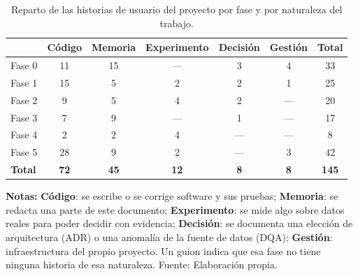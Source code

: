
\begin{table}[htbp]
  \centering
  \caption{Reparto de las historias de usuario del proyecto por fase y por
    naturaleza del trabajo.}
  \label{tab:resumen_backlog}
  \small
  \begin{tabular}{@{}l ccccc c@{}}
    \toprule
                   & \textbf{Código} & \textbf{Memoria} & \textbf{Experimento} & \textbf{Decisión} & \textbf{Gestión} & \textbf{Total} \\
    \midrule
    Fase 0         & 11              & 15               & ---                  & 3                 & 4                & 33             \\
    Fase 1         & 15              & 5                & 2                    & 2                 & 1                & 25             \\
    Fase 2         & 9               & 5                & 4                    & 2                 & ---              & 20             \\
    Fase 3         & 7               & 9                & ---                  & 1                 & ---              & 17             \\
    Fase 4         & 2               & 2                & 4                    & ---               & ---              & 8              \\
    Fase 5         & 28              & 9                & 2                    & ---               & 3                & 42             \\
    \midrule
    \textbf{Total} & \textbf{72}     & \textbf{45}      & \textbf{12}          & \textbf{8}        & \textbf{8}       & \textbf{145}   \\
    \bottomrule
  \end{tabular}
  \begin{minipage}{0.95\textwidth}
    \vspace{4pt}
    \tiny
    \textbf{Notas:} \textbf{Código}: se escribe o se corrige software y sus pruebas;
    \textbf{Memoria}: se redacta una parte de este documento; \textbf{Experimento}: se mide
    algo sobre datos reales para poder decidir con evidencia; \textbf{Decisión}: se documenta
    una elección de arquitectura (ADR) o una anomalía de la fuente de datos (DQA);
    \textbf{Gestión}: infraestructura del propio proyecto. Un guion indica que esa fase no
    tiene ninguna historia de esa naturaleza. Fuente: Elaboración propia.
  \end{minipage}
\end{table}
